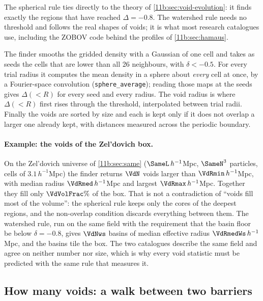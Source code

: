 The spherical rule ties directly to the theory of
\cref{11b:sec:void-evolution}: it finds exactly the regions that have reached
$\Delta=-0.8$. The watershed rule needs no threshold and follows the real shapes of
voids; it is what most research catalogues use, including the ZOBOV code behind the
profiles of \cref{11b:sec:hamaus}.


\noindent
The finder smooths the gridded density with a Gaussian of one cell and takes as
seeds the cells that are lower than all 26 neighbours, with $\delta<-0.5$. For every
trial radius it computes the mean density in a sphere about \emph{every} cell at
once, by a Fourier-space convolution (\texttt{sphere\_average}); reading those maps
at the seeds gives $\Delta(<R)$ for every seed and every radius. The void radius
is where $\Delta(<R)$ first rises through the threshold, interpolated between trial
radii. Finally the voids are sorted by size and each is kept only if it does not
overlap a larger one already kept, with distances measured across the periodic
boundary.

\paragraph{Example: the voids of the Zel'dovich box.}
On the Zel'dovich universe of \cref{11b:sec:same} ($\SameL\,h^{-1}$Mpc,
$\SameN^3$ particles, cells of $3.1\,h^{-1}$Mpc) the finder returns
$\VdN$ voids larger than $\VdRmin\,h^{-1}$Mpc, with median radius
$\VdRmed\,h^{-1}$Mpc and largest $\VdRmax\,h^{-1}$Mpc. Together they fill only
$\VdVolFrac\%$ of the box. That is not a contradiction of ``voids fill most of the
volume'': the spherical rule keeps only the cores of the deepest regions, and the
non-overlap condition discards everything between them. The watershed rule, run on
the same field with the requirement that the basin floor be below $\delta=-0.8$,
gives $\VdNws$ basins of median effective radius $\VdRmedWs\,h^{-1}$Mpc, and the
basins tile the box. The two catalogues describe the same field and agree on
neither number nor size, which is why every void statistic must be predicted
with the same rule that measures it.

\subsection{How many voids: a walk between two barriers}
\label{11b:sec:svdw}

